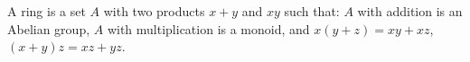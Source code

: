 A ring is a set $A$ with two products $x + y$ and $xy$ such that: $A$ with addition is an Abelian group, $A$ with multiplication is a monoid, and $x(y+z)=xy+xz$, $(x+y)z=xz+yz$.
